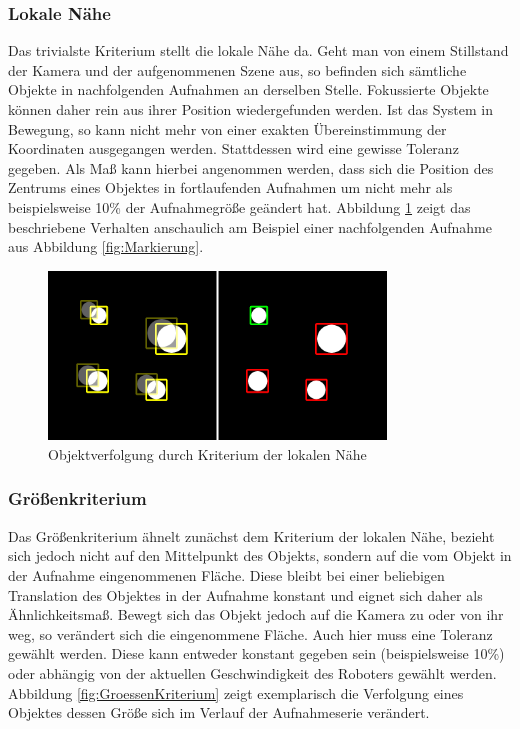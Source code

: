 \subsubsection{Lokale Nähe}
Das trivialste Kriterium stellt die lokale Nähe da. Geht man von einem Stillstand der Kamera und der aufgenommenen Szene aus, so befinden sich sämtliche Objekte in nachfolgenden Aufnahmen an derselben Stelle. Fokussierte Objekte können daher rein aus ihrer Position wiedergefunden werden. Ist das System in Bewegung, so kann nicht mehr von einer exakten Übereinstimmung der Koordinaten ausgegangen werden. Stattdessen wird eine gewisse Toleranz gegeben. Als Maß kann hierbei angenommen werden, dass sich die Position des Zentrums eines Objektes in fortlaufenden Aufnahmen um nicht mehr als beispielsweise 10\% der Aufnahmegröße geändert hat. Abbildung \ref{fig:LokaleNaehe} zeigt das beschriebene Verhalten anschaulich am Beispiel einer nachfolgenden Aufnahme aus Abbildung \ref{fig:Markierung}. 

\begin{figure}[h]
\centering
\includegraphics[width=0.8\textwidth]{Bilder/Workloop/MovingMarker}
\caption{Objektverfolgung durch Kriterium der lokalen Nähe}
\label{fig:LokaleNaehe}
\end{figure}

\subsubsection{Größenkriterium}
Das Größenkriterium ähnelt zunächst dem Kriterium der lokalen Nähe, bezieht sich jedoch nicht auf den Mittelpunkt des Objekts, sondern auf die vom Objekt in der Aufnahme eingenommenen Fläche. Diese bleibt bei einer beliebigen Translation des Objektes in der Aufnahme konstant und eignet sich daher als Ähnlichkeitsmaß. Bewegt sich das Objekt jedoch auf die Kamera zu oder von ihr weg, so verändert sich die eingenommene Fläche. Auch hier muss eine Toleranz gewählt werden. Diese kann entweder konstant gegeben sein (beispielsweise 10\%) oder abhängig von der aktuellen Geschwindigkeit des Roboters gewählt werden. Abbildung \ref{fig:GroessenKriterium} zeigt exemplarisch die Verfolgung eines Objektes dessen Größe sich im Verlauf der Aufnahmeserie verändert.

